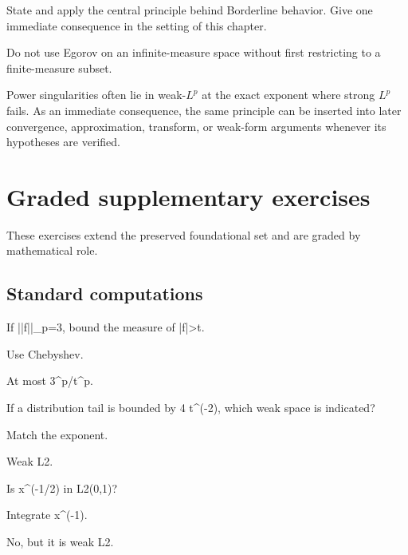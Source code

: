 \begin{exercise}\label{exr:iii08-08}
State and apply the central principle behind Borderline behavior. Give one immediate consequence in the setting of this chapter.
\end{exercise}
\begin{hint}
Do not use Egorov on an infinite-measure space without first restricting to a finite-measure subset.
\end{hint}
\begin{solution}
Power singularities often lie in weak-$L^p$ at the exact exponent where strong $L^p$ fails. As an immediate consequence, the same principle can be inserted into later convergence, approximation, transform, or weak-form arguments whenever its hypotheses are verified.
\end{solution}


\section{Graded supplementary exercises}
These exercises extend the preserved foundational set and are graded by mathematical role.

\subsection*{Standard computations}

\begin{exercise}[Chebyshev]\label{exr:iii08-expand-01}
If ||f||\_p=3, bound the measure of |f|>t.
\end{exercise}
\begin{hint}
Use Chebyshev.
\end{hint}
\begin{solution}
At most 3\textasciicircum{}p/t\textasciicircum{}p.
\end{solution}

\begin{exercise}\label{exr:iii08-expand-02}
If a distribution tail is bounded by 4 t\textasciicircum{}(-2), which weak space is indicated?
\end{exercise}
\begin{hint}
Match the exponent.
\end{hint}
\begin{solution}
Weak L2.
\end{solution}

\begin{exercise}\label{exr:iii08-expand-03}
Is x\textasciicircum{}(-1/2) in L2(0,1)?
\end{exercise}
\begin{hint}
Integrate x\textasciicircum{}(-1).
\end{hint}
\begin{solution}
No, but it is weak L2.
\end{solution}

